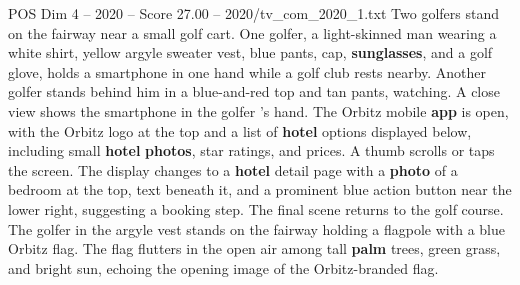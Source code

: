 \begin{textsample}{POS Dim 4 – 2020 – Score 27.00 – 2020/tv\_com\_2020\_1.txt}
Two golfers stand on the fairway near a small golf cart.
One golfer, a light-skinned man wearing a white shirt, yellow argyle sweater vest, blue pants, cap, \textbf{sunglasses}, and a golf glove, holds a smartphone in one hand while a golf club rests nearby.
Another golfer stands behind him in a blue-and-red top and tan pants, watching.
A close view shows the smartphone in the golfer ’s hand.
The Orbitz mobile \textbf{app} is open, with the Orbitz logo at the top and a list of \textbf{hotel} options displayed below, including small \textbf{hotel} \textbf{photos}, star ratings, and prices.
A thumb scrolls or taps the screen.
The display changes to a \textbf{hotel} detail page with a \textbf{photo} of a bedroom at the top, text beneath it, and a prominent blue action button near the lower right, suggesting a booking step.
The final scene returns to the golf course.
The golfer in the argyle vest stands on the fairway holding a flagpole with a blue Orbitz flag.
The flag flutters in the open air among tall \textbf{palm} trees, green grass, and bright sun, echoing the opening image of the Orbitz-branded flag.

\end{textsample}
